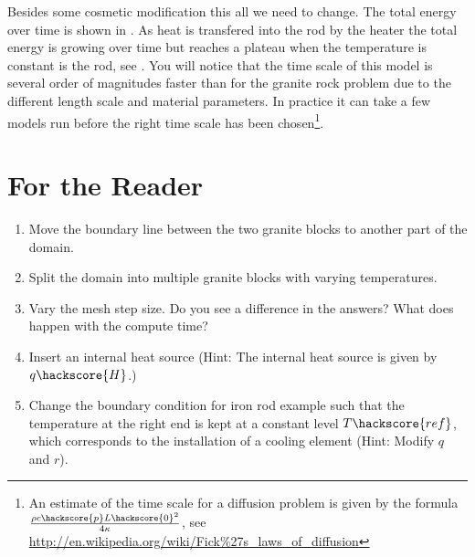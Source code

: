 Besides some cosmetic modification this all we need to change. The total energy over time is shown in . As heat
is transfered into the rod by the heater the total energy is growing over time but reaches a plateau 
when the temperature is constant is the rod, see . 
You will notice that the time scale of this model is several order of magnitudes faster than
for the granite rock problem due to the different length scale and material parameters. 
In practice it can take a few models run before the right time scale has been chosen\footnote{An estimate of the
time scale for a diffusion problem is given by the formula $\frac{\rho c\hackscore{p} L\hackscore{0}^2}{4 \kappa}$, see
\url{http://en.wikipedia.org/wiki/Fick\%27s_laws_of_diffusion}}.






\section{For the Reader}
\begin{enumerate}
 \item Move the boundary line between the two granite blocks to another part of the domain.
 \item Split the domain into multiple granite blocks with varying temperatures.
 \item Vary the mesh step size. Do you see a difference in the answers? What does happen with the compute time?
 \item Insert an internal heat source (Hint: The internal heat source is given by $q\hackscore{H}$.)
 \item Change the boundary condition for iron rod example such that the temperature 
 at the right end is kept at a constant level $T\hackscore{ref}$, which corresponds to the installation of a cooling element (Hint: Modify $q$ and $r$). 
\end{enumerate}

